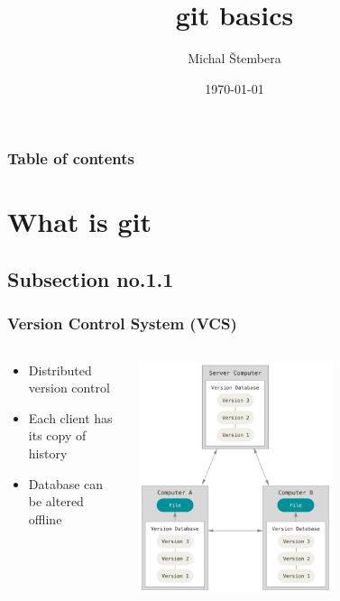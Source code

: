\documentclass[hyperref={pdfpagelabels=false}]{beamer}
\title{git basics}
\author{Michal \v{S}tembera}
\date{\today}
\begin{document}
\begin{frame}
	\titlepage
\end{frame} 


\begin{frame}
\frametitle{Table of contents}
\tableofcontents
\end{frame} 

%
\section{What is git} 
\subsection{Subsection no.1.1}
\begin{frame}
\frametitle{Version Control System (VCS)}
\begin{columns}
\begin{column}{0.4\textwidth}
	\begin{itemize}
		\item Distributed version control
		\item Each client has its copy of history
		\item Database can be altered offline
	\end{itemize}
\end{column}
\begin{column}{0.6\textwidth}  %
    \begin{center}
     \includegraphics[width=0.6\textwidth]{distributed}
     \end{center}
\end{column} 
\end{columns}
\end{frame}
\end{document}
